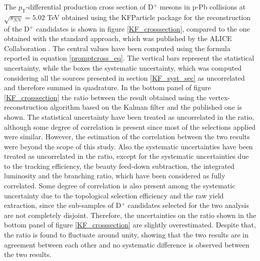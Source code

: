 \documentclass[b5paper,10pt,twoside,oldstyle,classica]{toptesi}
\newcommand{\pt}{p_\text{T}}
\begin{document}
The $\pt$-differential production cross section of D$^+$ mesons in p-Pb collisions at $\sqrt{s_{NN}}=5.02$ TeV obtained using the KFParticle package for the reconstruction of the D$^+$ candidates is shown in figure \ref{KF_crosssection}, compared to the one obtained with the standard approach, which was published by the ALICE Collaboration \cite{Abelev:2014hha}. The central values have been computed using the formula reported in equation \ref{promptcross_eq}. The vertical bars represent the statistical uncertainty, while the boxes the systematic uncertainty, which was computed considering all the sources presented in section \ref{KF_syst_sec} as uncorrelated and therefore summed in quadrature. In the bottom panel of figure \ref{KF_crosssection} the ratio between the result obtained using the vertex-reconstruction algorithm based on the Kalman filter and the published one is shown. The statistical uncertainty have been treated as uncorrelated in the ratio, although some degree of correlation is present since most of the selections applied were similar. However, the estimation of the correlation between the two results were beyond the scope of this study. Also the systematic uncertainties have been treated as uncorrelated in the ratio, except for the systematic uncertainties due to the tracking efficiency, the beauty feed-down subtraction, the integrated luminosity and the branching ratio, which have been considered as fully correlated. Some degree of correlation is also present among the systematic uncertainty due to the topological selection efficiency and the raw yield extraction, since the sub-samples of D$^+$ candidates selected for the two analysis are not completely disjoint. Therefore, the uncertainties on the ratio shown in the bottom panel of figure \ref{KF_crosssection} are slightly overestimated. Despite that, the ratio is found to fluctuate around unity, showing that the two results are in agreement between each other and no systematic difference is observed between the two results.  
\end{document}
